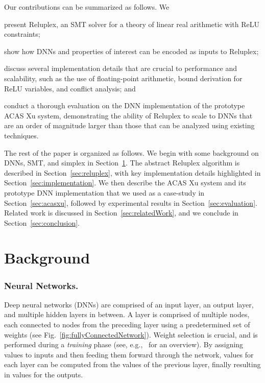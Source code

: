 \documentclass[a4paper]{llncs}
\begin{document}
Our contributions can be summarized as follows. We
\begin{inparaenum}[(i)]
\item present Reluplex, an SMT solver for a theory of linear
  real arithmetic with ReLU constraints;
\item show how DNNs and properties of interest can be encoded as
  inputs to Reluplex;
\item discuss several implementation details that are crucial to performance and scalability, such as the
  use of floating-point arithmetic, bound derivation for ReLU variables,
  and conflict analysis; and 
\item conduct a thorough evaluation on the DNN implementation of
  the prototype ACAS Xu system, demonstrating the ability of Reluplex to scale
  to DNNs that are an order of magnitude larger than those that can be analyzed using
  existing techniques.
\end{inparaenum}

The rest of the paper is organized as follows. We begin with some background
on DNNs, SMT, and simplex in
Section~\ref{sec:background}. 
 The abstract Reluplex algorithm is described in 
Section~\ref{sec:reluplex}, with key implementation details
highlighted in Section~\ref{sec:implementation}.
We then 
describe
the ACAS Xu system and its prototype DNN implementation that we used as a case-study
in Section~\ref{sec:acasxu},
followed by
experimental results in Section~\ref{sec:evaluation}.
 Related work is discussed in Section~\ref{sec:relatedWork}, and we
conclude in Section~\ref{sec:conclusion}.

\section{Background}
\label{sec:background}

\subsubsection{Neural Networks.}
Deep neural networks (DNNs) are comprised of an input layer, an output layer, 
and multiple hidden layers in between. A layer is comprised of multiple
nodes, each connected to 
nodes from the preceding layer using a predetermined set of weights
(see Fig.~\ref{fig:fullyConnectedNetwork}).
Weight selection is crucial, and is performed during a
\emph{training} phase (see, e.g.,~\cite{FoBeCu16} for an overview).
By assigning values to inputs
and then feeding them forward through the network, values for each layer
can be computed from the values of the previous layer, finally resulting in values
for the outputs. 
\end{document}
